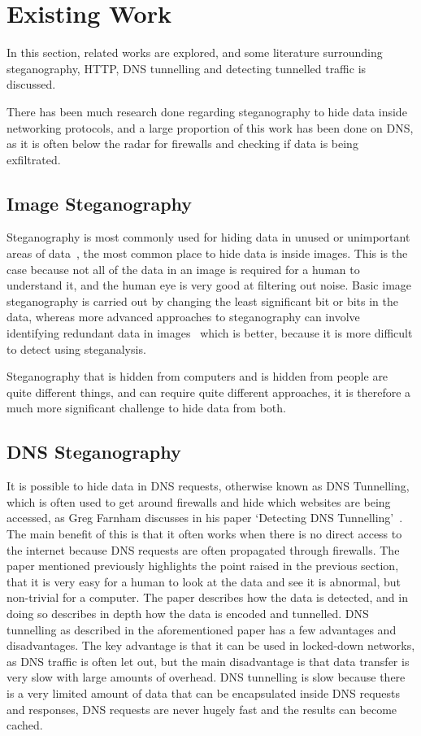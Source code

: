 \section{Existing Work}
In this section, related works are explored, and some literature surrounding steganography, HTTP, DNS tunnelling and detecting tunnelled traffic is discussed.

There has been much research done regarding steganography to hide data inside networking protocols, and a large proportion of this work has been done on DNS, as it is often below the radar for firewalls and checking if data is being exfiltrated.
\subsection{Image Steganography}
Steganography is most commonly used for hiding data in unused or unimportant areas of data~\cite{exploringsteno}, the most common place to hide data is inside images. This is the case because not all of the data in an image is required for a human to understand it, and the human eye is very good at filtering out noise.
Basic image steganography is carried out by changing the least significant bit or bits in the data, whereas more advanced approaches to steganography can involve identifying redundant data in images~\cite{introsteno} which is better, because it is more difficult to detect using steganalysis.

Steganography that is hidden from computers and is hidden from people are quite different things, and can require quite different approaches, it is therefore a much more significant challenge to hide data from both.

\subsection{DNS Steganography}
It is possible to hide data in DNS requests, otherwise known as DNS Tunnelling, which is often used to get around firewalls and hide which websites are being accessed, as Greg Farnham discusses in his paper `Detecting DNS Tunnelling'~\cite{detectingdns}. The main benefit of this is that it often works when there is no direct access to the internet because DNS requests are often propagated through firewalls.
The paper mentioned previously highlights the point raised in the previous section, that it is very easy for a human to look at the data and see it is abnormal, but non-trivial for a computer.
The paper describes how the data is detected, and in doing so describes in depth how the data is encoded and tunnelled.
DNS tunnelling as described in the aforementioned paper has a few advantages and disadvantages.
The key advantage is that it can be used in locked-down networks, as DNS traffic is often let out, but the main disadvantage is that data transfer is very slow with large amounts of overhead.
DNS tunnelling is slow because there is a very limited amount of data that can be encapsulated inside DNS requests and responses, DNS requests are never hugely fast and the results can become cached.
